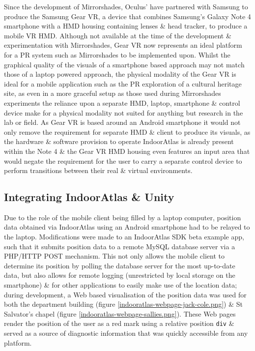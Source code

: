 Since the development of Mirrorshades, Oculus' have partnered with Samsung to produce the Samsung Gear VR, a device that combines Samsung's Galaxy Note 4 smartphone with a HMD housing containing lenses \& head tracker, to produce a mobile VR HMD. Although not available at the time of the development \& experimentation with Mirrorshades, Gear VR now represents an ideal platform for a PR system such as Mirrorshades to be implemented upon. Whilst the graphical quality of the visuals of a smartphone based approach may not match those of a laptop powered approach, the physical modality of the Gear VR is ideal for a mobile application such as the PR exploration of a cultural heritage site, as even in a more graceful setup as those used during Mirrorshades experiments the reliance upon a separate HMD, laptop, smartphone \& control device make for a physical modality not suited for anything but research in the lab or field. As Gear VR is based around an Android smartphone it would not only remove the requirement for separate HMD \& client to produce its visuals, as the hardware \& software provision to operate IndoorAtlas is already present within the Note 4 \& the Gear VR HMD housing even features an input area that would negate the requirement for the user to carry a separate control device to perform transitions between their real \& virtual environments.


\subsection{Integrating IndoorAtlas \& Unity}

Due to the role of the mobile client being filled by a laptop computer, position data obtained via IndoorAtlas using an Android smartphone had to be relayed to the laptop. Modifications were made to an IndoorAtlas SDK beta example app, such that it submits position data to a remote MySQL database server via a PHP/HTTP POST mechanism. This not only allows the mobile client to determine its position by polling the database server for the most up-to-date data, but also allows for remote logging (unrestricted by local storage on the smartphone) \& for other applications to easily make use of the location data; during development, a Web based visualisation of the position data was used for both the department building (figure \ref{indooratlas-webpage-jack-cole.png}) \& St Salvator's chapel (figure \ref{indooratlas-webpage-sallies.png}). These Web pages render the position of the user as a red mark using a relative position \texttt{div} \& served as a source of diagnostic information that was quickly accessible from any platform.

